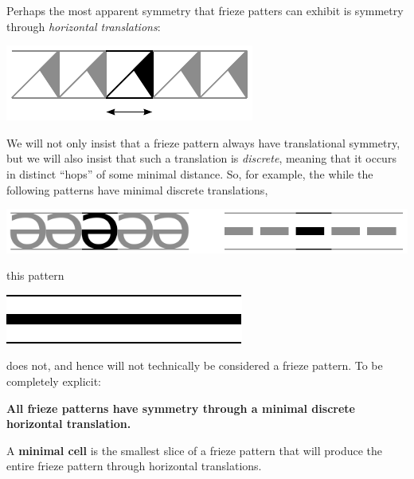 Perhaps the most apparent symmetry that frieze patters can exhibit is
symmetry through \textit{horizontal translations}:
\begin{center}
\includegraphics{../graphics/fptrans.pdf}
\end{center}
We will not only insist that a frieze pattern always have
translational symmetry, but we will also insist that such a
translation is \textit{discrete}, meaning that it occurs in distinct
``hops'' of some minimal distance. So, for example, the while the
following patterns have minimal discrete translations, 
\begin{center}
\includegraphics{../graphics/fptransDis.pdf}
\end{center}
this pattern
\begin{center}
\includegraphics{../graphics/fptransNot.pdf}
\end{center}
does not, and hence will not technically be considered a frieze
pattern. To be completely explicit: 
\begin{center}
\textbf{All frieze patterns have symmetry through a minimal discrete
  horizontal translation.}
\end{center}
\begin{dfn}
A \textbf{minimal cell} is the smallest slice of a frieze
pattern that will produce the entire frieze pattern through horizontal
translations.
\end{dfn}

